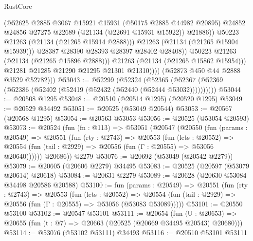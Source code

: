 \begin{lexlean}{RustCore}
\begin{coremodule}
                              (@52625
                                @2885
                                @3067
                                @15921
                                @15931
                                (@50175 @2885 @44982 @20895)
                                @24852
                                @24856
                                @27275
                                @22689
                                (@21134 (@22691 @15931 @15922))
                                @21886))
                            @50223
                            @21263
                            (@21134 (@21265 @15914 @2888)))
                          @21263
                          (@21134 (@21265 @15904 @15939)))
                        @28387
                        @28390
                        @28393
                        @28397
                        @28402
                        @28408))
                    @50223
                    @21263
                    (@21134 (@21265 @15896 @2888)))
                  @21263
                  (@21134 (@21265 @15862 @15954)))
                @21281
                @21285
                @21290
                @21295
                @21301
                @21310))))
        (@52873 @450 @44 @2888 @3529 @52782)))
@53043 := @52299
    (@52324 (@52365 (@52367 (@52369 (@52386 (@52402 (@52419 (@52432 (@52440 (@52444 @53032))))))))))
@53044 := @20508 @1295
@53048 := @20510 (@20514 @1295) (@20520 @1295)
@53049 := @20529 @34492
@53051 := @20525 (@53049 @20544)
@53053 := @20567 (@20568 @1295)
@53054 := @20563 @53053
@53056 := @20525 (@53054 @20593)
@53073 := @20524
    (fun (fn : @113) =>
    @53051
      (@20547
        (@20550
          (fun (params : @20549) =>
          @20551
            (fun (rty : @2743) =>
            @20553
              (fun (lets : @20552) =>
              @20554 (fun (tail : @2929) => @20556 (fun (Γ : @20555) => @53056 @20640))))))
        @20686))
    @2279
@53076 := @20692 (@53049 (@20542 @2279))
@53079 := @20605 (@20606 @2279) @34495
@53083 := @20525 (@20597 (@53079 @20614) @20618)
@53084 := @20631 @2279
@53089 := @20628 (@20630 @53084 @34498 @20586 @20588)
@53100 := fun (params : @20549) =>
  @20551
    (fun (rty : @2743) =>
    @20553
      (fun (lets : @20552) =>
      @20554 (fun (tail : @2929) => @20556 (fun (Γ : @20555) => @53056 (@53083 @53089)))))
@53101 := @20550 @53100
@53102 := @20547 @53101
@53111 := @20654
    (fun (U : @20653) => @20655 (fun (t : @7) => @20663 (@20525 (@20669 @34495 @20543) @20680)))
@53114 := @53076 (@53102 @53111) @34493
@53116 := @20510 @53101 @53111

\end{coremodule}
\end{lexlean}
